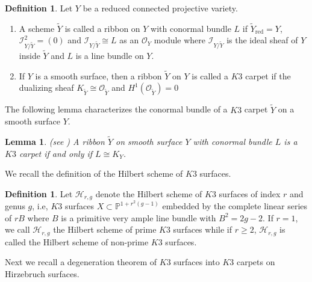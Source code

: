\documentclass[11pt,twoside]{amsart}
\theoremstyle{plain}
\numberwithin{equation}{section}
\newtheorem{lemma}[theorem]{Lemma}
\theoremstyle{definition}
\newtheorem{definition}[theorem]{Definition}
\begin{document}
\begin{definition}\label{ribbon}
Let $Y$ be a reduced connected projective variety.
 \begin{enumerate}
     \item A scheme $\widetilde{Y}$ is called a ribbon on $Y$ with conormal bundle $L$ if $\widetilde{Y}_{\operatorname{red}} = Y$, $\mathcal{I}_{Y/\widetilde{Y}}^2 = (0)$ and $\mathcal{I}_{Y/\widetilde{Y}} \cong L$ as an $\mathcal{O}_Y$ module where $\mathcal{I}_{Y/\widetilde{Y}}$ is the ideal sheaf of $Y$ inside $\widetilde{Y}$ and $L$ is a line bundle on $Y$. 

     \item If $Y$ is a smooth surface, then a ribbon $\widetilde{Y}$ on $Y$ is called a $K3$ carpet if the dualizing sheaf $K_{\widetilde{Y}} \cong \mathcal{O}_{\widetilde{Y}}$ and $H^1(\mathcal{O}_{\widetilde{Y}})= 0$

\end{enumerate}
\end{definition}  

The following lemma characterizes the conormal bundle of a $K3$ carpet $\widetilde{Y}$ on a smooth surface $Y$.

\begin{lemma}(see \cite[Proposition $2.1$]{GGP08})
    A ribbon $\widetilde{Y}$ on smooth surface $Y$ with conormal bundle $L$ is a $K3$ carpet if and only if $L \cong K_Y$.
\end{lemma}

\color{black}
We recall the definition of the Hilbert scheme of $K3$ surfaces.

\begin{definition}\label{Hilbert schemes of K3 surfaces}
    Let $\mathcal{H}_{r,g}$ denote the Hilbert scheme of $K3$ surfaces of index $r$ and genus $g$, i.e, $K3$ surfaces $X \subset \mathbb{P}^{1+r^2(g-1)}$ embedded by the complete linear series of $rB$ where $B$ is a primitive very ample line bundle with $B^2 = 2g-2$. If $r = 1$, we call $\mathcal{H}_{r,g}$ the Hilbert scheme of prime $K3$ surfaces while if $r \geq 2$, $\mathcal{H}_{r,g}$ is called the Hilbert scheme of non-prime $K3$ surfaces.
\end{definition}
\color{black}

Next we recall a degeneration theorem of $K3$ surfaces into $K3$ carpets on Hirzebruch surfaces.
\end{document}
